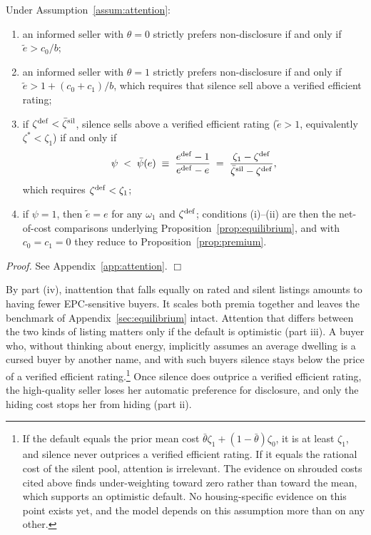 \begin{proposition}
\label{prop:att_incentives}
Under Assumption~\ref{assum:attention}:
\begin{enumerate}[label=(\roman*)]
    \item an informed seller with $\theta=0$ strictly prefers non-disclosure if and only if $\tilde e>c_0/b$;
    \item an informed seller with $\theta=1$ strictly prefers non-disclosure if and only if $\tilde e>1+(c_0+c_1)/b$, which requires that silence sell above a verified efficient rating;
    \item if $\zeta^{\rm def}<\bar \zeta^{\rm sil}$, silence sells above a verified efficient rating ($\tilde e>1$, equivalently $\zeta^*<\zeta_1$) if and only if
    \begin{equation}
        \psi\;<\;\bar\psi(e)\;\equiv\;\frac{e^{\rm def}-1}{e^{\rm def}-e}\;=\;\frac{\zeta_1-\zeta^{\rm def}}{\bar \zeta^{\rm sil}-\zeta^{\rm def}},
        \label{eq:att_psibar}
    \end{equation}
    which requires $\zeta^{\rm def}<\zeta_1$;
    \item if $\psi=1$, then $\tilde e=e$ for any $\omega_1$ and $\zeta^{\rm def}$; conditions (i)--(ii) are then the net-of-cost comparisons underlying Proposition~\ref{prop:equilibrium}, and with $c_0=c_1=0$ they reduce to Proposition~\ref{prop:premium}.
\end{enumerate}
\end{proposition}

\noindent\textit{Proof.} See Appendix~\ref{app:attention}. $\Box$

By part (iv), inattention that falls equally on rated and silent listings amounts to having fewer EPC-sensitive buyers. It scales both premia together and leaves the benchmark of Appendix~\ref{sec:equilibrium} intact. Attention that differs between the two kinds of listing matters only if the default is optimistic (part iii). A buyer who, without thinking about energy, implicitly assumes an average dwelling is a cursed buyer by another name, and with such buyers silence stays below the price of a verified efficient rating.\footnote{If the default equals the prior mean cost $\bar\theta \zeta_1+(1-\bar\theta)\zeta_0$, it is at least $\zeta_1$, and silence never outprices a verified efficient rating. If it equals the rational cost of the silent pool, attention is irrelevant. The evidence on shrouded costs cited above finds under-weighting toward zero rather than toward the mean, which supports an optimistic default. No housing-specific evidence on this point exists yet, and the model depends on this assumption more than on any other.} Once silence does outprice a verified efficient rating, the high-quality seller loses her automatic preference for disclosure, and only the hiding cost stops her from hiding (part ii).

